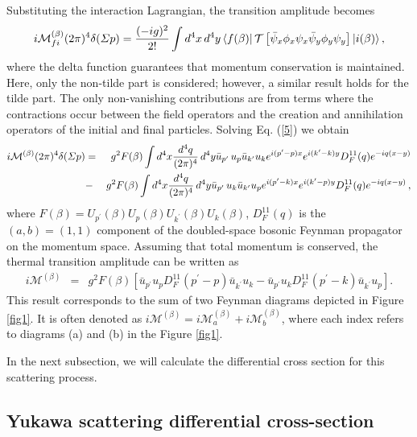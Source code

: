 \documentclass[11pt,showpacs,preprintnumbers,amsmath,amssymb,prd,nofootinbib,superscriptaddress]{revtex4-2}
\begin{document}
Substituting the interaction Lagrangian, the transition amplitude becomes
\begin{equation}
\label{5}
    i\mathcal{M}_{fi}^{(\beta)} (2\pi)^4 \delta (\Sigma p) = \frac{(-ig)^2}{2!}\int d^4x \, d^4y \bra{f(\beta)} \mathcal{T}\left[ \Bar{\psi}_x\phi _x\psi _x \Bar{\psi}_y \phi _y\psi _y\right] \ket{i(\beta)},
\end{equation}
where the delta function guarantees that momentum conservation is maintained. Here, only the non-tilde part is considered; however, a similar result holds for the tilde part. The only non-vanishing contributions are from terms where the contractions occur between the field operators and the creation and annihilation operators of the initial and final particles. 
Solving Eq. (\ref{5})  we obtain
\begin{eqnarray}
    \label{}
    \nonumber i\mathcal{M}^{(\beta)}(2\pi)^4 \delta (\Sigma p) &=&  g^2F(\beta)\int d^4x \frac{d^4q}{(2\pi)^4} \, d^4y \Bar{u}_{{p}^\prime}\, u_p \Bar{u}_{{k}^\prime} u_k e^{i(p^\prime-p)x} e^{i(k^\prime-k)y} D_F^{11}(q) e^{-iq(x-y)} \\
    &-& g^2F(\beta)\int d^4x \frac{d^4q}{(2\pi)^4} \, d^4y \Bar{u}_{{p}^\prime}\, u_k \Bar{u}_{{k}^\prime} u_p e^{i(p^\prime-k)x} e^{i(k^\prime-p)y} D_F^{11}(q) e^{-iq(x-y)} \, ,
\end{eqnarray}
 where $F(\beta)=U_{p^\prime}(\beta)U_{p}(\beta)U_{k^\prime}(\beta)U_{k}(\beta)$, $D^{11}_F(q)$ is the $(a,b)=(1,1)$ component of the doubled-space bosonic Feynman propagator on the momentum space. Assuming that total momentum is conserved, the thermal transition amplitude can be written as
\begin{eqnarray}
    i\mathcal{M}^{(\beta)}&=&g^2F(\beta)\left[\bar{u}_{p^\prime}u_pD_F^{11}(p^\prime-p)\bar{u}_{k^\prime}u_k-\bar{u}_{p^\prime}u_kD_F^{11}(p^\prime-k)\bar{u}_{k^\prime}u_p\right].\label{eq08}
\end{eqnarray}
This result corresponds to the sum of two Feynman diagrams depicted in Figure \ref{fig1}. It is often denoted as $i\mathcal{M}^{(\beta)}=i\mathcal{M}_{a}^{(\beta)}+i\mathcal{M}_{b}^{(\beta)}$, where each index refers to diagrams (a) and (b) in the Figure \ref{fig1}.

In the next subsection, we will calculate the differential cross section for this scattering process.


\subsection{Yukawa scattering differential cross-section}\label{seccross}
\end{document}
